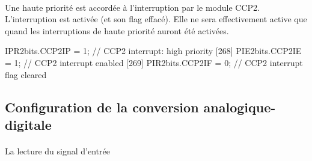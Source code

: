 \documentclass{article}
\begin{document}
    \paragraph{}
    Une haute priorité est accordée à l'interruption par le module CCP2. L'interruption est activée (et son flag effacé). Elle ne sera effectivement active que quand les interruptions de haute priorité auront été activées.
    \begin{verbatimtab}
    [267]    IPR2bits.CCP2IP = 1;    // CCP2 interrupt: high priority
    [268]    PIE2bits.CCP2IE = 1;    // CCP2 interrupt enabled
    [269]    PIR2bits.CCP2IF = 0;    // CCP2 interrupt flag cleared
    \end{verbatimtab}











    \subsection{Configuration de la conversion analogique-digitale}
    \paragraph{}
    La lecture du signal d'entrée
\end{document}
